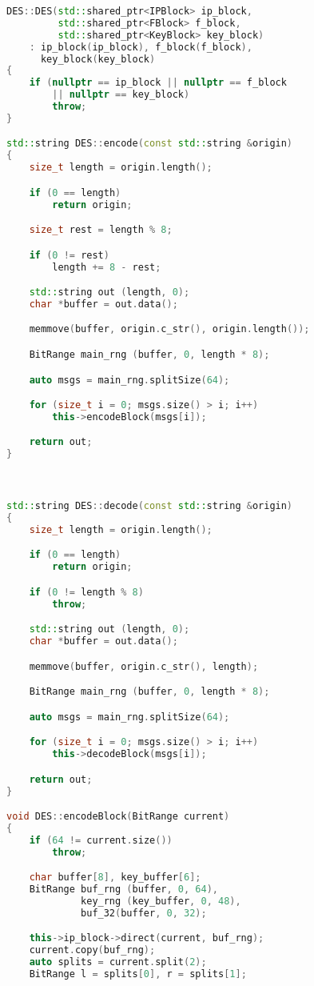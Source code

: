 \begin{lstlisting}[language=c++, caption={Класс, реализующий алгоритм DES}]
DES::DES(std::shared_ptr<IPBlock> ip_block,
         std::shared_ptr<FBlock> f_block,
         std::shared_ptr<KeyBlock> key_block)
    : ip_block(ip_block), f_block(f_block),
      key_block(key_block)
{
    if (nullptr == ip_block || nullptr == f_block
        || nullptr == key_block)
        throw;
}

std::string DES::encode(const std::string &origin)
{
    size_t length = origin.length();

    if (0 == length)
        return origin;

    size_t rest = length % 8;

    if (0 != rest)
        length += 8 - rest;

    std::string out (length, 0);
    char *buffer = out.data();

    memmove(buffer, origin.c_str(), origin.length());

    BitRange main_rng (buffer, 0, length * 8);

    auto msgs = main_rng.splitSize(64);

    for (size_t i = 0; msgs.size() > i; i++)
        this->encodeBlock(msgs[i]);

    return out;
}



std::string DES::decode(const std::string &origin)
{
    size_t length = origin.length();

    if (0 == length)
        return origin;

    if (0 != length % 8)
        throw;

    std::string out (length, 0);
    char *buffer = out.data();

    memmove(buffer, origin.c_str(), length);

    BitRange main_rng (buffer, 0, length * 8);

    auto msgs = main_rng.splitSize(64);

    for (size_t i = 0; msgs.size() > i; i++)
        this->decodeBlock(msgs[i]);

    return out;
}

void DES::encodeBlock(BitRange current)
{
    if (64 != current.size())
        throw;

    char buffer[8], key_buffer[6];
    BitRange buf_rng (buffer, 0, 64),
             key_rng (key_buffer, 0, 48),
             buf_32(buffer, 0, 32);

    this->ip_block->direct(current, buf_rng);
    current.copy(buf_rng);
    auto splits = current.split(2);
    BitRange l = splits[0], r = splits[1];


\end{lstlisting}
